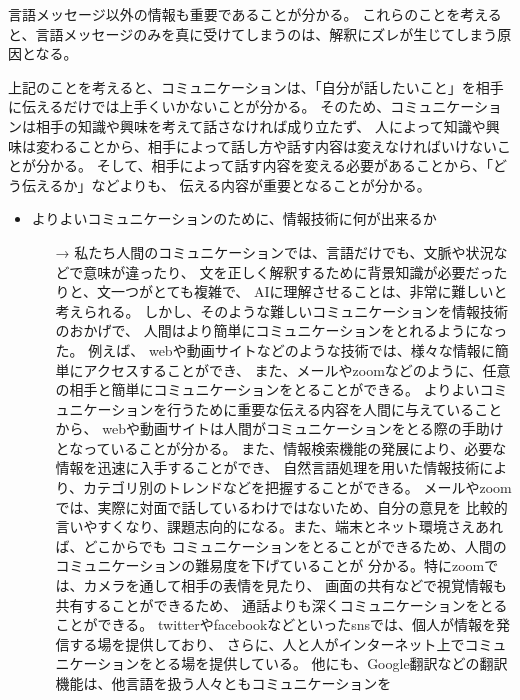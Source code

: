\documentclass[dvipdfmx]{jsarticle}
\begin{document}
\begin{itemize}
\begin{itemize}
\begin{itemize}
      言語メッセージ以外の情報も重要であることが分かる。
      これらのことを考えると、言語メッセージのみを真に受けてしまうのは、解釈にズレが生じてしまう原因となる。
    \end{itemize}
    上記のことを考えると、コミュニケーションは、「自分が話したいこと」を相手に伝えるだけでは上手くいかないことが分かる。
    そのため、コミュニケーションは相手の知識や興味を考えて話さなければ成り立たず、
    人によって知識や興味は変わることから、相手によって話し方や話す内容は変えなければいけないことが分かる。
    そして、相手によって話す内容を変える必要があることから、「どう伝えるか」などよりも、
    伝える内容が重要となることが分かる。
  \end{itemize}
\end{itemize}
\begin{itemize}
  \item よりよいコミュニケーションのために、情報技術に何が出来るか
  \begin{itemize}
    \item[→] 私たち人間のコミュニケーションでは、言語だけでも、文脈や状況などで意味が違ったり、
    文を正しく解釈するために背景知識が必要だったりと、文一つがとても複雑で、
    AIに理解させることは、非常に難しいと考えられる。
    しかし、そのような難しいコミュニケーションを情報技術のおかげで、
    人間はより簡単にコミュニケーションをとれるようになった。
    例えば、
    webや動画サイトなどのような技術では、様々な情報に簡単にアクセスすることができ、
    また、メールやzoomなどのように、任意の相手と簡単にコミュニケーションをとることができる。
    よりよいコミュニケーションを行うために重要な伝える内容を人間に与えていることから、
    webや動画サイトは人間がコミュニケーションをとる際の手助けとなっていることが分かる。
    また、情報検索機能の発展により、必要な情報を迅速に入手することができ、
    自然言語処理を用いた情報技術により、カテゴリ別のトレンドなどを把握することができる。
    メールやzoomでは、実際に対面で話しているわけではないため、自分の意見を
    比較的言いやすくなり、課題志向的になる。また、端末とネット環境さえあれば、どこからでも
    コミュニケーションをとることができるため、人間のコミュニケーションの難易度を下げていることが
    分かる。特にzoomでは、カメラを通して相手の表情を見たり、
    画面の共有などで視覚情報も共有することができるため、
    通話よりも深くコミュニケーションをとることができる。
    twitterやfacebookなどといったsnsでは、個人が情報を発信する場を提供しており、
    さらに、人と人がインターネット上でコミュニケーションをとる場を提供している。
    他にも、Google翻訳などの翻訳機能は、他言語を扱う人々ともコミュニケーションを

\end{itemize}
\end{itemize}
\end{document}
